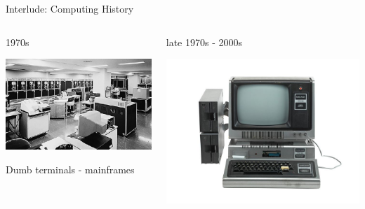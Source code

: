 \documentclass{beamer}
\begin{document}
\begin{frame}{Interlude: Computing History}

\begin{columns}[T]
\begin{column}{.33\linewidth}
1970s

\includegraphics[width=\linewidth]{images/mainframe_1975}

Dumb terminals - mainframes
\end{column}

\begin{column}{.3\linewidth}
late 1970s - 2000s

\includegraphics[trim=0 9mm 0 9mm,clip, width=\linewidth]{images/trs-80}


\end{column}
\end{columns}
\end{frame}
\end{document}
